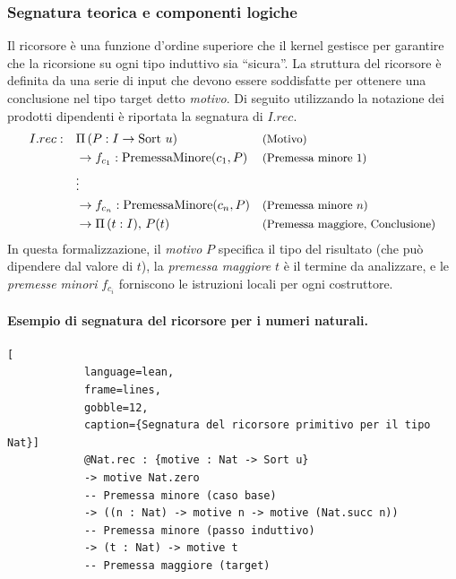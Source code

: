 \subsubsection{Segnatura teorica e componenti logiche}
Il ricorsore è una funzione d'ordine superiore che il kernel gestisce per garantire che la ricorsione su ogni tipo induttivo sia ``sicura''. La struttura 
del ricorsore è definita da una serie di input che devono essere soddisfatte per ottenere una conclusione nel tipo target detto \emph{motivo}. Di seguito 
utilizzando la notazione dei prodotti dipendenti è riportata la segnatura di $I.rec$.
\begin{equation}
    \begin{aligned}
        I.rec : \quad & \Pi \, (P : I \to \text{Sort } u) && \text{\small (Motivo)}               \\ & 
        \to f_{c_1} : \text{PremessaMinore}(c_1, P)       && \text{\small (Premessa minore 1)}    \\ & 
        \vdots                                            &&                                      \\ & 
        \to f_{c_n} : \text{PremessaMinore}(c_n, P)       && \text{\small (Premessa minore $n$)}  \\ & 
        \to \Pi \, (t : I), \, P(t)                       && \text{\small (Premessa maggiore, Conclusione)}
    \end{aligned}
\end{equation}
In questa formalizzazione, il \emph{motivo} $P$ specifica il tipo del risultato (che può dipendere dal valore di $t$), la \emph{premessa maggiore} 
$t$ è il termine da analizzare, e le \emph{premesse minori} $f_{c_i}$ forniscono le istruzioni locali per ogni costruttore.


\paragraph{Esempio di segnatura del ricorsore per i numeri naturali.}
\begin{center}
    \begin{minipage}{0.9\textwidth}
        \begin{lstlisting}[
            language=lean, 
            frame=lines, 
            gobble=12, 
            caption={Segnatura del ricorsore primitivo per il tipo Nat}]
            @Nat.rec : {motive : Nat -> Sort u}
            -> motive Nat.zero 
            -- Premessa minore (caso base)
            -> ((n : Nat) -> motive n -> motive (Nat.succ n))
            -- Premessa minore (passo induttivo)
            -> (t : Nat) -> motive t
            -- Premessa maggiore (target)
        \end{lstlisting}
    \end{minipage}
\end{center}

